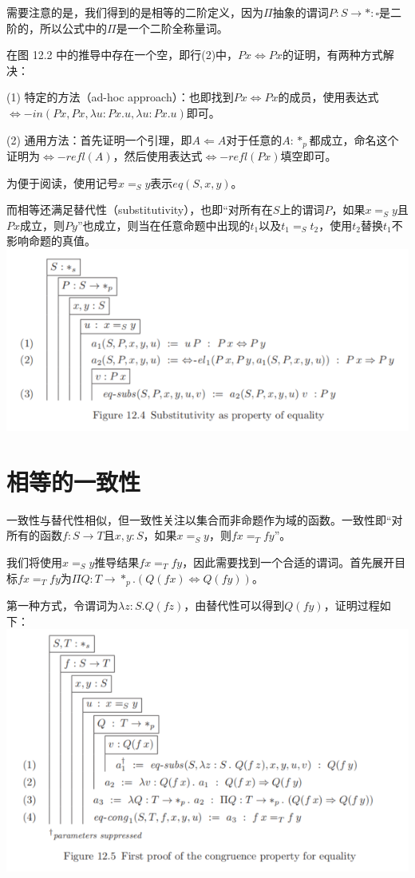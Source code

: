 \documentclass[UTF8]{article}
\begin{document}
		需要注意的是，我们得到的是相等的二阶定义，因为$\Pi$抽象的谓词$P:S\rightarrow*:\square$是二阶的，所以公式中的$\Pi$是一个二阶全称量词。
		
		在图 12.2 中的推导中存在一个空，即行(2)中，$Px\Leftrightarrow Px$的证明，有两种方式解决：
		
		(1) 特定的方法（ad-hoc approach）：也即找到$Px\Leftrightarrow Px$的成员，使用表达式$\Leftrightarrow{-in}(Px,Px,\lambda u:Px.u,\lambda u:Px.u)$即可。
		
		(2) 通用方法：首先证明一个引理，即$A\Leftarrow A$对于任意的$A:*_p$都成立，命名这个证明为$\Leftrightarrow{-refl}(A)$，然后使用表达式$\Leftrightarrow{-refl}(Px)$填空即可。
		
		为便于阅读，使用记号$x=_S y$表示$eq(S,x,y)$。
		
		而相等还满足替代性（substitutivity），也即“对所有在$S$上的谓词$P$，如果$x=_S y$且$Px$成立，则$Py$”也成立，则当在任意命题中出现的$t_1$以及$t_1=_S t_2$，使用$t_2$替换$t_1$不影响命题的真值。\\
		\includegraphics[width=0.93\linewidth]{"../imgs/12-4.png"}
		
	\section{相等的一致性}
	\noindent
	一致性与替代性相似，但一致性关注以集合而非命题作为域的函数。一致性即“对所有的函数$f:S\rightarrow T$且$x,y:S$，如果$x=_S y$，则$fx=_T fy$”。
	
		我们将使用$x=_S y$推导结果$fx=_T fy$，因此需要找到一个合适的谓词。首先展开目标$fx=_T fy$为$\Pi Q:T\rightarrow*_p.(Q(fx)\Leftrightarrow Q(fy))$。
		
		第一种方式，令谓词为$\lambda z:S.Q(fz)$，由替代性可以得到$Q(fy)$，证明过程如下：\\
		\includegraphics[width=0.93\linewidth]{"../imgs/12-5.png"}
		
\end{document}
